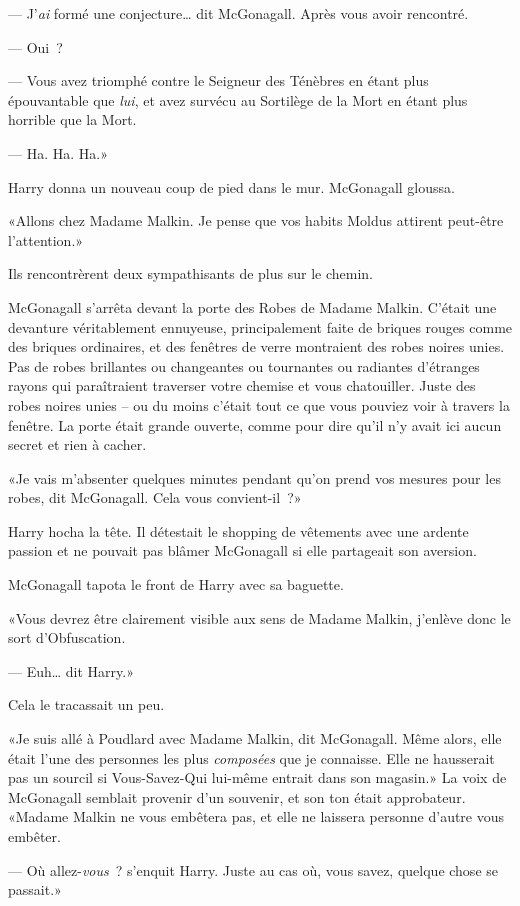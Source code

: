 --- J'\emph{ai} formé une conjecture… dit McGonagall. Après vous avoir rencontré.

--- Oui~?

--- Vous avez triomphé contre le Seigneur des Ténèbres en étant plus épouvantable que \emph{lui}, et avez survécu au Sortilège de la Mort en étant plus horrible que la Mort.

--- Ha. Ha. Ha.»

Harry donna un nouveau coup de pied dans le mur. McGonagall gloussa.

«Allons chez Madame Malkin. Je pense que vos habits Moldus attirent peut-être l'attention.»

Ils rencontrèrent deux sympathisants de plus sur le chemin.

McGonagall s'arrêta devant la porte des Robes de Madame Malkin. C'était une devanture véritablement ennuyeuse, principalement faite de briques rouges comme des briques ordinaires, et des fenêtres de verre montraient des robes noires unies. Pas de robes brillantes ou changeantes ou tournantes ou radiantes d'étranges rayons qui paraîtraient traverser votre chemise et vous chatouiller. Juste des robes noires unies -- ou du moins c'était tout ce que vous pouviez voir à travers la fenêtre. La porte était grande ouverte, comme pour dire qu'il n'y avait ici aucun secret et rien à cacher.

«Je vais m'absenter quelques minutes pendant qu'on prend vos mesures pour les robes, dit McGonagall. Cela vous convient-il~?»

Harry hocha la tête. Il détestait le shopping de vêtements avec une ardente passion et ne pouvait pas blâmer McGonagall si elle partageait son aversion.

McGonagall tapota le front de Harry avec sa baguette.

«Vous devrez être clairement visible aux sens de Madame Malkin, j'enlève donc le sort d'Obfuscation.

--- Euh… dit Harry.»

Cela le tracassait un peu.

«Je suis allé à Poudlard avec Madame Malkin, dit McGonagall. Même alors, elle était l'une des personnes les plus \emph{composées} que je connaisse. Elle ne hausserait pas un sourcil si Vous-Savez-Qui lui-même entrait dans son magasin.» La voix de McGonagall semblait provenir d'un souvenir, et son ton était approbateur. «Madame Malkin ne vous embêtera pas, et elle ne laissera personne d'autre vous embêter.

--- Où allez-\emph{vous}~? s'enquit Harry. Juste au cas où, vous savez, quelque chose se passait.»


